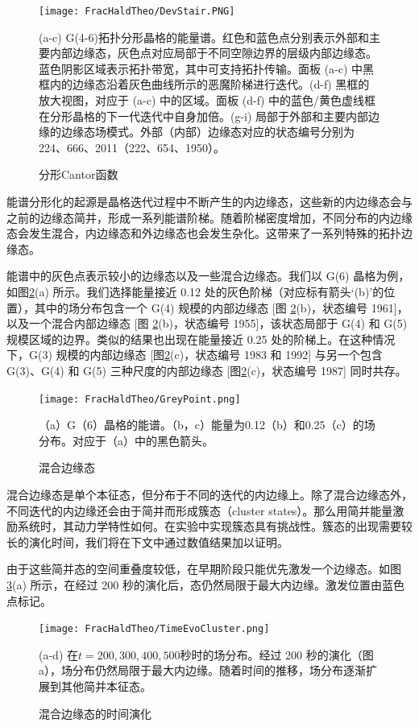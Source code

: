 \begin{figure}[htbp]
    \centering
    \texttt{[image: FracHaldTheo/DevStair.PNG]}
    \caption{分形Cantor函数}(a-c) G(4-6)拓扑分形晶格的能量谱。红色和蓝色点分别表示外部和主要内部边缘态，灰色点对应局部于不同空隙边界的层级内部边缘态。蓝色阴影区域表示拓扑带宽，其中可支持拓扑传输。面板 (a-c) 中黑框内的边缘态沿着灰色曲线所示的恶魔阶梯进行迭代。(d-f) 黑框的放大视图，对应于 (a-c) 中的区域。面板 (d-f) 中的蓝色/黄色虚线框在分形晶格的下一代迭代中自身加倍。(g-i) 局部于外部和主要内部边缘的边缘态场模式。外部（内部）边缘态对应的状态编号分别为 224、666、2011（222、654、1950）。
    \label{fig:DevStair}
\end{figure}

能谱分形化的起源是晶格迭代过程中不断产生的内边缘态，这些新的内边缘态会与之前的边缘态简并，形成一系列能谱阶梯。随着阶梯密度增加，不同分布的内边缘态会发生混合，内边缘态和外边缘态也会发生杂化。这带来了一系列特殊的拓扑边缘态。

能谱中的灰色点表示较小的边缘态以及一些混合边缘态。我们以 G(6) 晶格为例，如图\ref{fig:GreyPoint}(a) 所示。我们选择能量接近 0.12 处的灰色阶梯（对应标有箭头‘(b)’的位置），其中的场分布包含一个 G(4) 规模的内部边缘态 [图 \ref{fig:GreyPoint}(b)，状态编号 1961]，以及一个混合内部边缘态 [图 \ref{fig:GreyPoint}(b)，状态编号 1955]，该状态局部于 G(4) 和 G(5) 规模区域的边界。类似的结果也出现在能量接近 0.25 处的阶梯上。在这种情况下，G(3) 规模的内部边缘态 [图\ref{fig:GreyPoint}(c)，状态编号 1983 和 1992] 与另一个包含 G(3)、G(4) 和 G(5) 三种尺度的内部边缘态 [图\ref{fig:GreyPoint}(c)，状态编号 1987] 同时共存。
\begin{figure}[htbp]
    \centering
    \texttt{[image: FracHaldTheo/GreyPoint.png]}
    \caption{混合边缘态}（a）G（6）晶格的能谱。（b，c）能量为0.12（b）和0.25（c）的场分布。对应于（a）中的黑色箭头。
    \label{fig:GreyPoint}
\end{figure}

混合边缘态是单个本征态，但分布于不同的迭代的内边缘上。除了混合边缘态外，不同迭代的内边缘还会由于简并而形成簇态（cluster states）。那么用简并能量激励系统时，其动力学特性如何。在实验中实现簇态具有挑战性。簇态的出现需要较长的演化时间，我们将在下文中通过数值结果加以证明。

由于这些简并态的空间重叠度较低，在早期阶段只能优先激发一个边缘态。如图 \ref{fig:TimeEvoCluster}(a) 所示，在经过 200 秒的演化后，态仍然局限于最大内边缘。激发位置由蓝色点标记。

\begin{figure}[htbp]
    \centering
    \texttt{[image: FracHaldTheo/TimeEvoCluster.png]}
    \caption{混合边缘态的时间演化}(a-d) 在$t=200,300,400,500$秒时的场分布。经过 200 秒的演化（图 a），场分布仍然局限于最大内边缘。随着时间的推移，场分布逐渐扩展到其他简并本征态。
    \label{fig:TimeEvoCluster}
\end{figure}

